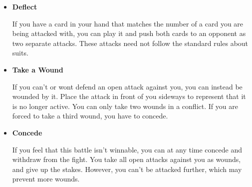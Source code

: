 \documentclass[]{article}
\begin{document}
{\begin{itemize}
			On your turn, if you have open attacks against you, you can resolve them by covering them with a greater or equal card of the same suit, or any card in the trump suit (though trump cards need to be covered by higher trump cards). Cards are worth the number written on them, with aces being worth 1 and all face cards worth 10. If you manage to defend against all attacks active against you, push the stacks of cards to enemies of your choice (they need not all go to the same enemy). Treat these as attacks with value equal to the card on the top of the pile. The same rules about suits apply to attacks made in this way as standard attacks. If no enemy can be attacked, the cards simply leave play.%
			
			\item \textbf{Deflect}
			
			If you have a card in your hand  that matches the number of a card you are being attacked with, you can play it and push both cards to an opponent as two separate attacks. These attacks need not follow the standard rules about suits.
			
			\item \textbf{Take a Wound}
			
			If you can't or wont defend an open attack against you, you can instead be wounded by it. Place the attack in front of you sideways to represent that it is no longer active. You can only take two wounds in a conflict. If you are forced to take a third wound, you have to concede.
			
			\item \textbf{Concede}
			
			If you feel that this battle isn't winnable, you can at any time concede and withdraw from the fight. You take all open attacks against you as wounds, and give up the stakes. However, you can't be attacked further, which may prevent more wounds.
		\end{itemize}
		
}
\end{document}
